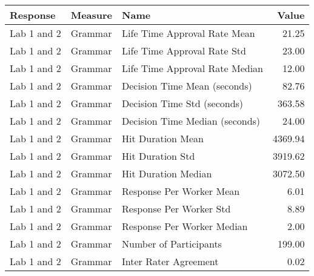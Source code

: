 \begin{tabular}{lllr}
\toprule
Response & Measure & Name & Value \\
\midrule
Lab 1 and 2 & Grammar & Life Time Approval Rate Mean & 21.25 \\
Lab 1 and 2 & Grammar & Life Time Approval Rate Std & 23.00 \\
Lab 1 and 2 & Grammar & Life Time Approval Rate Median & 12.00 \\
Lab 1 and 2 & Grammar & Decision Time Mean (seconds) & 82.76 \\
Lab 1 and 2 & Grammar & Decision Time Std (seconds) & 363.58 \\
Lab 1 and 2 & Grammar & Decision Time Median (seconds) & 24.00 \\
Lab 1 and 2 & Grammar & Hit Duration Mean & 4369.94 \\
Lab 1 and 2 & Grammar & Hit Duration Std & 3919.62 \\
Lab 1 and 2 & Grammar & Hit Duration Median & 3072.50 \\
Lab 1 and 2 & Grammar & Response Per Worker Mean & 6.01 \\
Lab 1 and 2 & Grammar & Response Per Worker Std & 8.89 \\
Lab 1 and 2 & Grammar & Response Per Worker Median & 2.00 \\
Lab 1 and 2 & Grammar & Number of Participants & 199.00 \\
Lab 1 and 2 & Grammar & Inter Rater Agreement & 0.02 \\
\bottomrule
\end{tabular}
